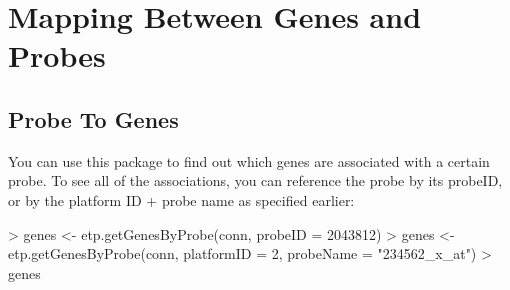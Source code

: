 \documentclass[a4paper]{article}
\begin{document}
\section{Mapping Between Genes and Probes}

\subsection{Probe To Genes}

You can use this package to find out which genes are associated with a certain probe. To see all of the associations, you can reference the probe by its probeID, or by the platform ID + probe name as specified earlier:

\begin{Schunk}
\begin{Sinput}
> genes <- etp.getGenesByProbe(conn, probeID = 2043812)
> genes <- etp.getGenesByProbe(conn, platformID = 2, probeName = "234562_x_at")
> genes
\end{Sinput}
\end{Schunk}
\end{document}
